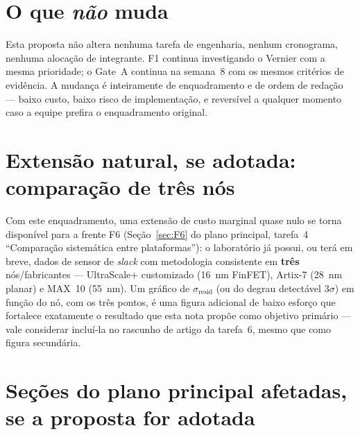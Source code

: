 \documentclass[11pt,a4paper]{article}
\begin{document}
\section{O que \emph{não} muda}

Esta proposta não altera nenhuma tarefa de engenharia, nenhum cronograma, nenhuma
alocação de integrante. F1 continua investigando o Vernier com a mesma prioridade;
o Gate~A continua na semana~8 com os mesmos critérios de evidência. A mudança é
inteiramente de enquadramento e de ordem de redação --- baixo custo, baixo risco de
implementação, e reversível a qualquer momento caso a equipe prefira o enquadramento
original.

\section{Extensão natural, se adotada: comparação de três nós}

Com este enquadramento, uma extensão de custo marginal quase nulo se torna
disponível para a frente F6 (Seção~\ref{sec:F6} do plano principal, tarefa~4 ``Comparação
sistemática entre plataformas''): o laboratório já possui, ou terá em breve, dados
de sensor de \emph{slack} com metodologia consistente em \textbf{três} nós/fabricantes
--- UltraScale+ customizado (\SI{16}{\nano\meter} FinFET), Artix-7 (\SI{28}{\nano\meter}
planar) e MAX~10 (\SI{55}{\nano\meter}). Um gráfico de
$\sigma_\text{resid}$ (ou do degrau detectável $3\sigma$) em função do nó, com os
três pontos, é uma figura adicional de baixo esforço que fortalece exatamente o
resultado que esta nota propõe como objetivo primário --- vale considerar incluí-la
no rascunho de artigo da tarefa~6, mesmo que como figura secundária.

\section{Seções do plano principal afetadas, se a proposta for adotada}
\end{document}
